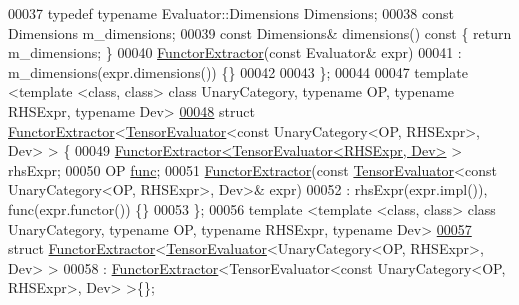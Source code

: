 \begin{DoxyCode}
00037   \textcolor{keyword}{typedef} \textcolor{keyword}{typename} Evaluator::Dimensions Dimensions;
00038   \textcolor{keyword}{const} Dimensions m\_dimensions;
00039   \textcolor{keyword}{const} Dimensions& dimensions()\textcolor{keyword}{ const }\{ \textcolor{keywordflow}{return} m\_dimensions; \}
00040   \hyperlink{struct_eigen_1_1_tensor_sycl_1_1internal_1_1_functor_extractor}{FunctorExtractor}(\textcolor{keyword}{const} Evaluator& expr)
00041   : m\_dimensions(expr.dimensions()) \{\}
00042 
00043 \};
00044 
00047 \textcolor{keyword}{template} <\textcolor{keyword}{template} <\textcolor{keyword}{class}, \textcolor{keyword}{class}> \textcolor{keyword}{class }UnaryCategory, \textcolor{keyword}{typename} OP, \textcolor{keyword}{typename} RHSExpr, \textcolor{keyword}{typename} Dev>
\hyperlink{struct_eigen_1_1_tensor_sycl_1_1internal_1_1_functor_extractor_3_01_tensor_evaluator_3_01const_0fbd0ddbd1a19882bd952645d7585353f}{00048} \textcolor{keyword}{struct }\hyperlink{struct_eigen_1_1_tensor_sycl_1_1internal_1_1_functor_extractor}{FunctorExtractor}<\hyperlink{struct_eigen_1_1_tensor_evaluator}{TensorEvaluator}<const UnaryCategory<OP, RHSExpr>, 
      Dev> > \{
00049   \hyperlink{struct_eigen_1_1_tensor_sycl_1_1internal_1_1_functor_extractor}{FunctorExtractor<TensorEvaluator<RHSExpr, Dev>} > rhsExpr;
00050   OP \hyperlink{structfunc}{func};
00051   \hyperlink{struct_eigen_1_1_tensor_sycl_1_1internal_1_1_functor_extractor}{FunctorExtractor}(\textcolor{keyword}{const} \hyperlink{struct_eigen_1_1_tensor_evaluator}{TensorEvaluator}<\textcolor{keyword}{const} UnaryCategory<OP, RHSExpr>, 
      Dev>& expr)
00052   : rhsExpr(expr.impl()), func(expr.functor()) \{\}
00053 \};
00056 \textcolor{keyword}{template} <\textcolor{keyword}{template} <\textcolor{keyword}{class}, \textcolor{keyword}{class}> \textcolor{keyword}{class }UnaryCategory, \textcolor{keyword}{typename} OP, \textcolor{keyword}{typename} RHSExpr, \textcolor{keyword}{typename} Dev>
\hyperlink{struct_eigen_1_1_tensor_sycl_1_1internal_1_1_functor_extractor_3_01_tensor_evaluator_3_01_unary_c1b2699d0091df11d376798d14bae48b}{00057} \textcolor{keyword}{struct }\hyperlink{struct_eigen_1_1_tensor_sycl_1_1internal_1_1_functor_extractor}{FunctorExtractor}<\hyperlink{struct_eigen_1_1_tensor_evaluator}{TensorEvaluator}<UnaryCategory<OP, RHSExpr>, Dev> >
00058 : \hyperlink{struct_eigen_1_1_tensor_sycl_1_1internal_1_1_functor_extractor}{FunctorExtractor}<TensorEvaluator<const UnaryCategory<OP, RHSExpr>, Dev> >\{\};

\end{DoxyCode}
